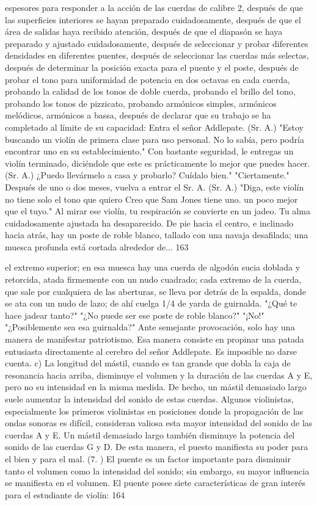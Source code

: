 espesores para responder a la acción de las cuerdas de calibre 2, después de que las superficies interiores se hayan preparado cuidadosamente, después de que el área de salidas haya recibido atención, después de que el diapasón se haya preparado y ajustado cuidadosamente, después de seleccionar y probar diferentes densidades en diferentes puentes, después de seleccionar las cuerdas más selectas, después de determinar la posición exacta para el puente y el poste, después de probar el tono para uniformidad de potencia en dos octavas en cada cuerda, probando la calidad de los tonos de doble cuerda, probando el brillo del tono, probando los tonos de pizzicato, probando armónicos simples, armónicos melódicos, armónicos a bassa, después de declarar que su trabajo se ha completado al límite de su capacidad:
Entra el señor Addlepate.
(Sr. A.) "Estoy buscando un violín de primera clase para uso personal. No lo sabía, pero podría encontrar uno en su establecimiento."
Con bastante seguridad, le entregas un violín terminado, diciéndole que este es prácticamente lo mejor que puedes hacer.
(Sr. A.)	¿Puedo llevármelo a casa y probarlo?
Cuídalo bien."	
"Ciertamente."	
Después de uno o dos meses, vuelva a entrar el Sr. A.	
(Sr. A.)	"Diga, este violín no tiene solo el
tono que quiero	Creo que Sam Jones tiene uno.
un poco mejor que el tuyo."
Al mirar ese violín, tu respiración se convierte en un jadeo. Tu alma cuidadosamente ajustada ha desaparecido. De pie hacia el centro, e inclinado hacia atrás, hay un poste de roble blanco, tallado con una navaja desafilada; una muesca profunda está cortada alrededor de...
163

el extremo superior; en esa muesca hay una cuerda de algodón sucia doblada y retorcida, atada firmemente con un nudo cuadrado; cada extremo de la cuerda, que sale por cualquiera de las aberturas, se lleva por detrás de la espalda, donde se ata con un nudo de lazo; de ahí cuelga 1/4 de yarda de guirnalda. "¿Qué te hace jadear tanto?" "¿No puede ser ese poste de roble blanco?"
"¡No!"
"¿Posiblemente sea esa guirnalda?"
Ante semejante provocación, solo hay una manera de manifestar patriotismo. Esa manera consiste en propinar una patada entusiasta directamente al cerebro del señor Addlepate. Es imposible no darse cuenta.
c) La longitud del mástil, cuando es tan grande que dobla la caja de resonancia hacia arriba, disminuye el volumen y la duración de las cuerdas A y E, pero no su intensidad en la misma medida. De hecho, un mástil demasiado largo suele aumentar la intensidad del sonido de estas cuerdas. Algunos violinistas, especialmente los primeros violinistas en posiciones donde la propagación de las ondas sonoras es difícil, consideran valiosa esta mayor intensidad del sonido de las cuerdas A y E. Un mástil demasiado largo también disminuye la potencia del sonido de las cuerdas G y D.
De esta manera, el puesto manifiesta su poder para el bien y
para el mal.
(7. ) El puente es un factor importante para disminuir tanto el volumen como la intensidad del sonido; sin embargo, su mayor influencia se manifiesta en el volumen. El puente posee siete características de gran interés para el estudiante de violín:
164

